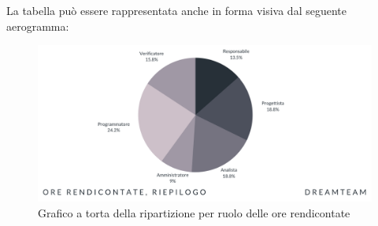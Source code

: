 La tabella può essere rappresentata anche in forma visiva dal seguente aerogramma:
\begin{figure}[!h]
\centering
\includegraphics[scale=0.65]{Sezioni/SezioniPreventivo/grafici/Riepilogo_ore_rendicontate_costi.png}
\caption{Grafico a torta della ripartizione per ruolo delle ore rendicontate}
\end{figure}